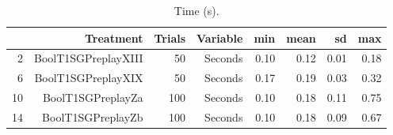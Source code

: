 \begin{table}[ht]
\centering
\begin{tabular}{rrrrrrrr}
  \hline
 & Treatment & Trials & Variable & min & mean & sd & max \\ 
  \hline
2 & BoolT1SGPreplayXIII &  50 & Seconds & 0.10 & 0.12 & 0.01 & 0.18 \\ 
  6 & BoolT1SGPreplayXIX &  50 & Seconds & 0.17 & 0.19 & 0.03 & 0.32 \\ 
  10 & BoolT1SGPreplayZa & 100 & Seconds & 0.10 & 0.18 & 0.11 & 0.75 \\ 
  14 & BoolT1SGPreplayZb & 100 & Seconds & 0.10 & 0.18 & 0.09 & 0.67 \\ 
   \hline
\end{tabular}
\caption{Time (s).} 
\end{table}
